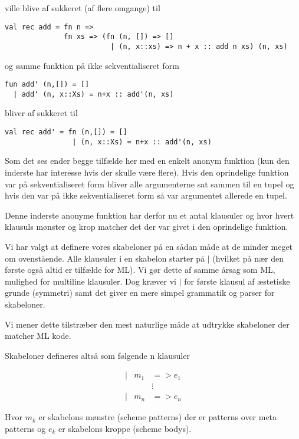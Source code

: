 \documentclass[oneside]{memoir}
\theoremstyle{definition}
\begin{document}
ville blive af sukkeret (af flere omgange) til

\begin{verbatim}
val rec add = fn n => 
              fn xs => (fn (n, []) => []
                         | (n, x::xs) => n + x :: add n xs) (n, xs)
\end{verbatim}

og samme funktion på ikke sekventialiseret form

\begin{verbatim}
fun add' (n,[]) = []
  | add' (n, x::Xs) = n+x :: add'(n, xs)
\end{verbatim}

bliver af sukkeret til 

\begin{verbatim}
val rec add' = fn (n,[]) = []
                | (n, x::Xs) = n+x :: add'(n, xs)
\end{verbatim}

Som det ses ender begge tilfælde her med en enkelt anonym funktion (kun den inderste
har interesse hvis der skulle være flere). Hvis den oprindelige funktion var på
sekventialiseret form bliver alle argumenterne sat sammen til en tupel og hvis
den var på ikke sekventialiseret form så var argumentet allerede en tupel.

Denne inderste anonyme funktion har derfor nu et antal klausuler og hvor hvert
klausuls mønster og krop matcher det der var givet i den oprindelige
funktion.

Vi har valgt at definere vores skabeloner på en sådan måde at de minder meget om
ovenstående. Alle klausuler i en skabelon starter på $|$ (hvilket på nær den
første også altid er tilfælde for ML). Vi gør dette af samme årsag som ML,
mulighed for multiline klausuler. Dog kræver vi $|$ for første klausul af
æstetiske grunde (symmetri) samt det giver en mere simpel grammatik og parser
for skabeloner. 

Vi mener dette tilstræber den mest naturlige måde at udtrykke skabeloner der
matcher ML kode.

Skabeloner defineres altså som følgende n klausuler

\begin{eqnarray*}[rqrl]
| & m_1 & => e_1 \\
  &  & \vdots \\
| & m_n & => e_n
\end{eqnarray*}

Hvor $m_k$ er skabelons mønstre (scheme patterns) der er patterns over meta
patterns og $e_k$ er skabelons kroppe (scheme bodys).
\end{document}
